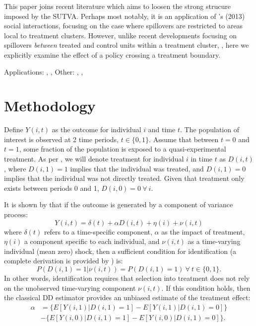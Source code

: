 \documentclass{article}
\begin{document}
\begin{spacing}{1.1}
This paper joins recent literature which aims to loosen the strong strucure 
imposed by the SUTVA.  Perhaps most notably, it is an application of 
\citeauthor{Manski2013}'s (2013) social interactions, focusing on the case
where spillovers are restricted to areas local to treatment clusters.  However,
unlike recent developments focusing on spillovers \emph{between} treated and 
control units within a treatment cluster, \citep{McIntosh2008,Bairdetal2014,
AngelucciDiMaro2010}, here we explicitly examine the effect of a policy crossing
a treatment boundary.

Applications: \citet{AngelucciDeGiorgi2009}, \citet{Heckmanetal1998}, 
\citet{MiguelKremer2004}
Other: , \citet{Heckmanetal1998b}, 

\section{Methodology}
Define $Y(i,t)$ as the outcome for individual $i$ and time $t$.  The population
of interest is observed at 2 time periods, $t\in \{0,1\}$.  Assume that between
$t=0$ and $t=1$, some fraction of the population is exposed to a 
quasi-experimental treatment.  As per \citet{Abadie2005}, we will denote 
treatment for individual $i$ in time $t$ as $D(i,t)$, where $D(i,1)=1$ implies 
that the individual was treated, and $D(i,1)=0$ implies that the individual was
not directly treated.  Given that treatment only exists between periods 0 and 1,
$D(i,0)=0\ \forall\ i$.

It is shown by \citet{AshenfelterCard1985} that if the outcome is generated by
a component of variance process:
\begin{equation}
\label{Seqn:COV}
Y(i,t)=\delta(t) + \alpha D(i,t)+\eta(i)+\nu(i,t)
\end{equation}
where $\delta(t)$ refers to a time-specific component, $\alpha$ as the impact of 
treatment, $\eta(i)$ a component specific to each individual, and $\nu(i,t)$ as 
a time-varying individual (mean zero) shock, then a sufficient condition for 
identification (a complete derivation is provided by \citet{Abadie2005}) is:
\begin{equation}
\label{Seqn:ID}
P(D(i,1)=1|\nu(i,t))=P(D(i,1)=1) \ \forall\ t\in\{0,1\}.
\end{equation}
In other words, identification requires that selection into treatment does not
rely on the unobserved time-varying component $\nu(i,t)$.  If this condition 
holds, then the classical DD estimator provides an unbiased estimate of the
treatment effect:
\begin{equation}
\label{Seqn:DD}
\begin{split}
\alpha&=\{E[Y(i,1)|D(i,1)=1]-E[Y(i,1)|D(i,1)=0]\} \\
      &-\{E[Y(i,0)|D(i,1)=1]-E[Y(i,0)|D(i,1)=0]\}.
\end{split}
\end{equation}


\end{spacing}
\end{document}

